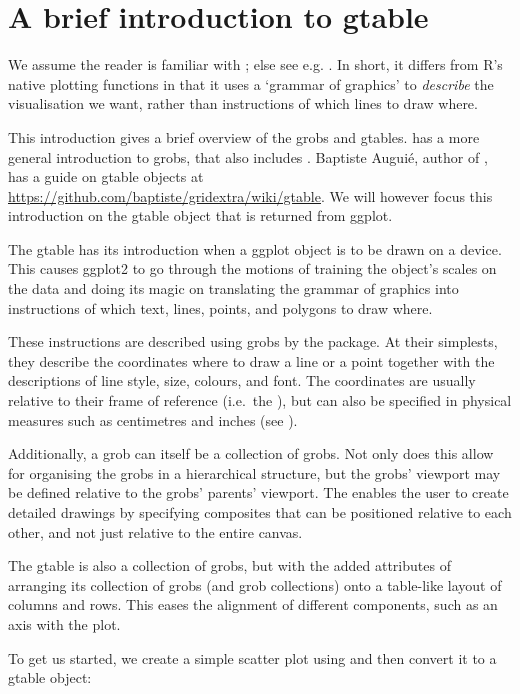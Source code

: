 \section{A brief introduction to gtable}

We assume the reader is familiar with ; else see e.g.
\citet{ggplot2016}. In short, it differs from R's native plotting
functions in that it uses a `grammar of graphics' to \emph{describe} the
visualisation we want, rather than instructions of which lines to draw
where.

This introduction gives a brief overview of the grobs and gtables.
\citet{Zhou2010} has a more general introduction to grobs, that also
includes . Baptiste Augui\'{e}, author of
 \citep{gridExtra}, has a guide on gtable objects at
\url{https://github.com/baptiste/gridextra/wiki/gtable}. We will however
focus this introduction on the gtable object that is returned from
ggplot.

The gtable has its introduction when a ggplot object is to be drawn on a
device. This causes ggplot2 to go through the motions of training the
object's scales on the data and doing its magic on translating the
grammar of graphics into instructions of which text, lines, points, and
polygons to draw where.

These instructions are described using grobs by the  package.
At their simplests, they describe the coordinates where to draw a line
or a point together with the descriptions of line style, size, colours,
and font. The coordinates are usually relative to their frame of
reference (i.e.~the ), but can also be specified in
physical measures such as centimetres and inches (see
).

Additionally, a grob can itself be a collection of grobs. Not only does
this allow for organising the grobs in a hierarchical structure, but the
grobs' viewport may be defined relative to the grobs' parents' viewport.
The enables the user to create detailed drawings by specifying
composites that can be positioned relative to each other, and not just
relative to the entire canvas.

The gtable is also a collection of grobs, but with the added attributes
of arranging its collection of grobs (and grob collections) onto a
table-like layout of columns and rows. This eases the alignment of
different components, such as an axis with the plot.

To get us started, we create a simple scatter plot using
 and then convert it to a gtable object:


